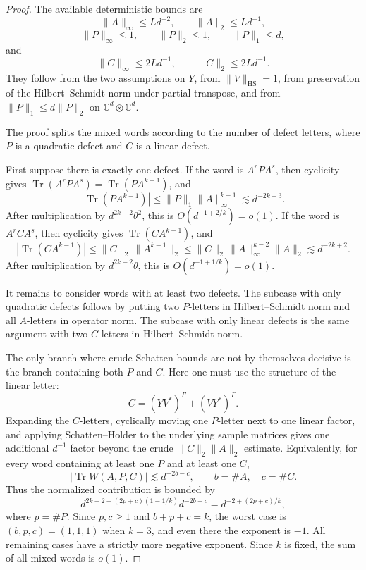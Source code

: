 \documentclass[11pt]{article}
\DeclareMathOperator{\Tr}{Tr}
\newcommand{\HS}{\mathrm{HS}}
\newcommand{\C}{\mathbb C}
\begin{document}
\begin{proof}
The available deterministic bounds are
\[
  \|A\|_\infty\le Ld^{-2},\qquad \|A\|_2\le Ld^{-1},
\]
\[
  \|P\|_\infty\le1,\qquad \|P\|_2\le1,\qquad \|P\|_1\le d,
\]
and
\[
  \|C\|_\infty\le2Ld^{-1},\qquad \|C\|_2\le2Ld^{-1}.
\]
They follow from the two assumptions on \(Y\), from
\(\|V\|_{\HS}=1\), from preservation of the Hilbert--Schmidt norm under
partial transpose, and from \(\|P\|_1\le d\|P\|_2\) on
\(\C^d\otimes\C^d\).

The proof splits the mixed words according to the number of defect letters,
where \(P\) is a quadratic defect and \(C\) is a linear defect.

First suppose there is exactly one defect.  If the word is \(A^{r}PA^s\), then
cyclicity gives \(\Tr(A^rPA^s)=\Tr(PA^{k-1})\), and
\[
  |\Tr(PA^{k-1})|\le \|P\|_1\|A\|_\infty^{k-1}
  \lesssim d^{-2k+3}.
\]
After multiplication by \(d^{2k-2}\theta^2\), this is
\(O(d^{-1+2/k})=o(1)\).  If the word is \(A^rCA^s\), then cyclicity gives
\(\Tr(CA^{k-1})\), and
\[
  |\Tr(CA^{k-1})|
  \le \|C\|_2\,\|A^{k-1}\|_2
  \le \|C\|_2\,\|A\|_\infty^{k-2}\|A\|_2
  \lesssim d^{-2k+2}.
\]
After multiplication by \(d^{2k-2}\theta\), this is
\(O(d^{-1+1/k})=o(1)\).

It remains to consider words with at least two defects.  The subcase with only
quadratic defects follows by putting two \(P\)-letters in Hilbert--Schmidt norm
and all \(A\)-letters in operator norm.  The subcase with only linear defects is
the same argument with two \(C\)-letters in Hilbert--Schmidt norm.

The only branch where crude Schatten bounds are not by themselves decisive is
the branch containing both \(P\) and \(C\).  Here one must use the structure of
the linear letter:
\[
  C=(YV^*)^\Gamma+(VY^*)^\Gamma .
\]
Expanding the \(C\)-letters, cyclically moving one \(P\)-letter next to one
linear factor, and applying Schatten--Holder to the underlying sample matrices
gives one additional \(d^{-1}\) factor beyond the crude
\(\|C\|_2\|A\|_2\) estimate.  Equivalently, for every word containing at least
one \(P\) and at least one \(C\),
\[
  |\Tr W(A,P,C)|
  \lesssim d^{-2b-c},
  \qquad b=\#A,\quad c=\#C .
\]
Thus the normalized contribution is bounded by
\[
  d^{2k-2-(2p+c)(1-1/k)}d^{-2b-c}
  =
  d^{-2+(2p+c)/k},
\]
where \(p=\#P\).  Since \(p,c\ge1\) and \(b+p+c=k\), the worst case is
\((b,p,c)=(1,1,1)\) when \(k=3\), and even there the exponent is \(-1\).
All remaining cases have a strictly more negative exponent.  Since \(k\) is
fixed, the sum of all mixed words is \(o(1)\).
\end{proof}
\end{document}
